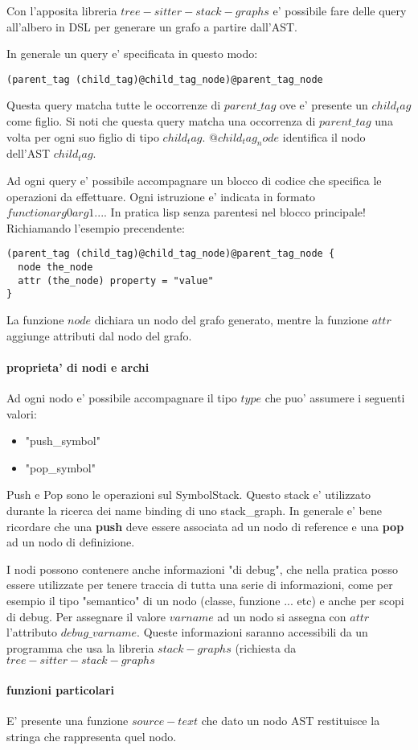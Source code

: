 Con l'apposita libreria $tree-sitter-stack-graphs$ e' possibile fare delle query all'albero in DSL per generare un grafo a partire dall'AST.

In generale un query e' specificata in questo modo:

\begin{verbatim}
(parent_tag (child_tag)@child_tag_node)@parent_tag_node
\end{verbatim}

Questa query matcha tutte le occorrenze di $parent\_tag$ ove e' presente un $child_tag$ come figlio. Si noti che questa query matcha una occorrenza di $parent\_tag$ una volta per ogni suo figlio di tipo $child_tag$. $@child_tag_node$ identifica il nodo dell'AST $child_tag$.

Ad ogni query e' possibile accompagnare un blocco di codice che specifica le operazioni da effettuare. Ogni istruzione e' indicata in formato $function arg0 arg1 ...$. In pratica lisp senza parentesi nel blocco principale! Richiamando l'esempio precendente:

\begin{verbatim}
(parent_tag (child_tag)@child_tag_node)@parent_tag_node {
  node the_node
  attr (the_node) property = "value"
}
\end{verbatim}

La funzione $node$ dichiara un nodo del grafo generato, mentre la funzione $attr$ aggiunge attributi dal nodo del grafo.

\paragraph{proprieta' di nodi e archi}

Ad ogni nodo e' possibile accompagnare il tipo $type$ che puo' assumere i seguenti valori:

\begin{itemize}
  \item "push\_symbol"
  \item "pop\_symbol"
\end{itemize}

Push e Pop sono le operazioni sul SymbolStack. Questo stack e' utilizzato durante la ricerca dei name binding di uno stack\_graph. In generale e' bene ricordare che una \textbf{push} deve essere associata ad un nodo di reference e una \textbf{pop} ad un nodo di definizione.

I nodi possono contenere anche informazioni "di debug", che nella pratica posso essere utilizzate per tenere traccia di tutta una serie di informazioni, come per esempio il tipo "semantico" di un nodo (classe, funzione ... etc) e anche per scopi di debug. Per assegnare il valore $varname$ ad un nodo si assegna con $attr$ l'attributo $debug\_varname$. Queste informazioni saranno accessibili da un programma che usa la libreria $stack-graphs$ (richiesta da $tree-sitter-stack-graphs$

\paragraph{funzioni particolari}

E' presente una funzione $source-text$ che dato un nodo AST restituisce la stringa che rappresenta quel nodo.
